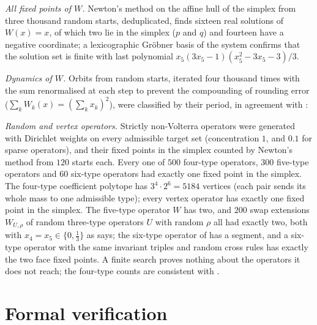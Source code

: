 \documentclass[11pt]{amsart}
\theoremstyle{definition}
\begin{document}
\emph{All fixed points of $W$.} Newton's method on the affine hull of the simplex from three thousand random starts, deduplicated, finds sixteen real solutions of $W(x)=x$, of which two lie in the simplex ($p$ and $q$) and fourteen have a negative coordinate; a lexicographic Gr\"obner basis of the system confirms that the solution set is finite with last polynomial $x_5(3x_5-1)(x_5^2-3x_5-3)/3$.

\emph{Dynamics of $W$.} Orbits from random starts, iterated four thousand times with the sum renormalised at each step to prevent the compounding of rounding error ($\sum_kW_k(x)=(\sum_kx_k)^2$), were classified by their period, in agreement with \cite[Theorem 5]{Jam17}: 

\emph{Random and vertex operators.} Strictly non-Volterra operators were generated with Dirichlet weights on every admissible target set (concentration $1$, and $0.1$ for sparse operators), and their fixed points in the simplex counted by Newton's method from $120$ starts each. Every one of $500$ four-type operators, $300$ five-type operators and $60$ six-type operators had exactly one fixed point in the simplex. The four-type coefficient polytope has $3^4\cdot2^6=5184$ vertices (each pair sends its whole mass to one admissible type); every vertex operator has exactly one fixed point in the simplex. The five-type operator $W$ has two, and $200$ swap extensions $W_{U,\rho}$ of random three-type operators $U$ with random $\rho$ all had exactly two, both with $x_4=x_5\in\{0,\frac13\}$ as  says; the six-type operator of  has a segment, and a six-type operator with the same invariant triples and random cross rules has exactly the two face fixed points. A finite search proves nothing about the operators it does not reach; the four-type counts are consistent with .

\section{Formal verification}\label{sec:lean}
\end{document}
